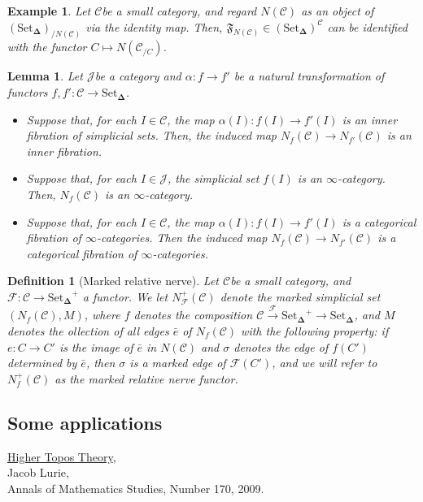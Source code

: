 \documentclass[12pt]{amsart}
\newcommand{\8}{\ensuremath{\infty}}
\newcommand{\C}{\ensuremath{\mathscr{C}}}
\newcommand{\J}{\ensuremath{\mathscr{J}}}
\newcommand{\SSet}{\ensuremath{\text{Set}_{\boldsymbol{\Delta}}}}
\newtheorem{definition}{Definition}
\newtheorem{lemma}{Lemma}
\newtheorem{example}{Example}
\begin{document}
\begin{example}
  Let \C be a small category, and regard $N(\C)$ as an object of $(\SSet)_{/N(\C)}$ via the identity map. Then, $\mathfrak{F}_{N(\C)} \in (\SSet)^\C$ can be identified with the functor $C \mapsto N(\C_{/C})$.
\end{example}

\begin{lemma}
  Let \J be a category and $\alpha : f \rightarrow f'$ be a natural transformation of functors $f, f' : \C \rightarrow \SSet$.
  \begin{itemize}
    \item Suppose that, for each $I \in \C$, the map $\alpha(I) : f(I) \rightarrow f'(I)$ is an inner fibration of simplicial sets. Then, the induced map $N_f(\C) \rightarrow N_{f'}(\C)$ is an inner fibration.
    \item Suppose that, for each $I \in \J$, the simplicial set $f(I)$ is an \8-category. Then, $N_f(\C)$ is an \8-category.
    \item Suppose that, for each $I \in \C$, the map $\alpha(I) : f(I) \rightarrow f'(I)$ is a categorical fibration of \8-categories. Then the induced map $N_f(\C) \rightarrow N_{f'}(\C)$ is a categorical fibration of \8-categories.~
  \end{itemize}
\end{lemma}

\begin{definition}[Marked relative nerve]
  Let \C be a small category, and $\mathcal{F}: \C \rightarrow \SSet^+$ a functor. We let $N_\mathcal{F}^+(\C)$ denote the marked simplicial set $(N_f(\C), M)$, where $f$ denotes the composition $\C \overset{\mathcal{F}}{\rightarrow} \SSet^+ \rightarrow \SSet$, and $M$ denotes the ollection of all edges $\bar{e}$ of $N_f(\C)$ with the following property: if $e: C \rightarrow C'$ is the image of $\bar{e}$ in $N(\C)$ and $\sigma$ denotes the edge of $f(C')$ determined by $\bar{e}$, then $\sigma$ is a marked edge of $\mathcal{F}(C')$, and we will refer to $N_f^+(\C)$ as the marked relative nerve functor.
\end{definition}

\subsection{Some applications}


\begin{thebibliography}{99}
  \href{https: //arxiv.org/abs/math/0608040}{Higher Topos Theory}, \\
  Jacob Lurie, \\
  Annals of Mathematics Studies, Number 170, 2009.
\end{thebibliography}
\end{document}
